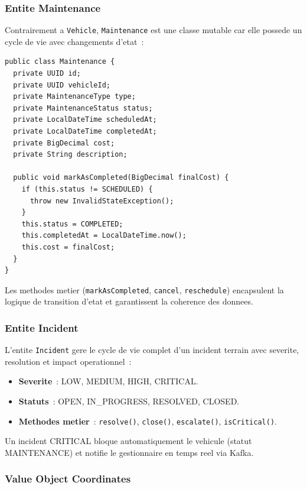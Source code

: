 \documentclass[12pt,a4paper]{report}
\begin{document}
\subsubsection{Entite Maintenance}

Contrairement a \texttt{Vehicle}, \texttt{Maintenance} est une classe
mutable car elle possede un cycle de vie avec changements d'etat~:

\begin{verbatim}
public class Maintenance {
  private UUID id;
  private UUID vehicleId;
  private MaintenanceType type;
  private MaintenanceStatus status;
  private LocalDateTime scheduledAt;
  private LocalDateTime completedAt;
  private BigDecimal cost;
  private String description;
  
  public void markAsCompleted(BigDecimal finalCost) {
    if (this.status != SCHEDULED) {
      throw new InvalidStateException();
    }
    this.status = COMPLETED;
    this.completedAt = LocalDateTime.now();
    this.cost = finalCost;
  }
}
\end{verbatim}

Les methodes metier (\texttt{markAsCompleted}, \texttt{cancel},
\texttt{reschedule}) encapsulent la logique de transition d'etat
et garantissent la coherence des donnees.

\subsubsection{Entite Incident}

L'entite \texttt{Incident} gere le cycle de vie complet d'un incident
terrain avec severite, resolution et impact operationnel~:

\begin{itemize}[leftmargin=2cm]
  \item \textbf{Severite}~: LOW, MEDIUM, HIGH, CRITICAL.
  \item \textbf{Statuts}~: OPEN, IN\_PROGRESS, RESOLVED, CLOSED.
  \item \textbf{Methodes metier}~: \texttt{resolve()}, \texttt{close()},
        \texttt{escalate()}, \texttt{isCritical()}.
\end{itemize}

Un incident CRITICAL bloque automatiquement le vehicule (statut MAINTENANCE)
et notifie le gestionnaire en temps reel via Kafka.

\subsubsection{Value Object Coordinates}
\end{document}
